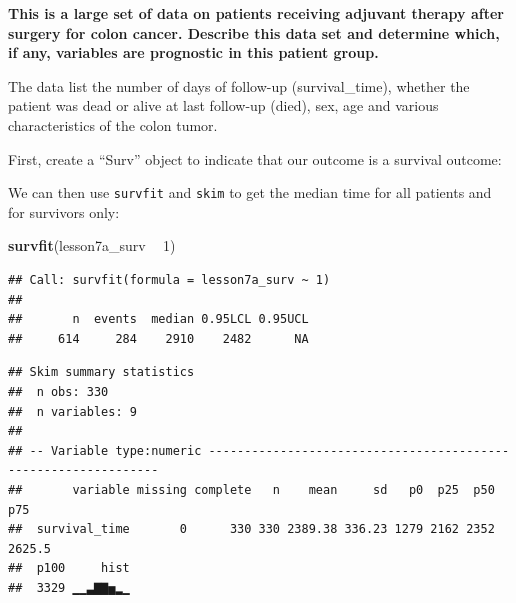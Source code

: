 \documentclass[]{book}
\newenvironment{Shaded}{\begin{snugshade}}{\end{snugshade}}
\newcommand{\DecValTok}[1]{\textcolor[rgb]{0.00,0.00,0.81}{#1}}
\newcommand{\KeywordTok}[1]{\textcolor[rgb]{0.13,0.29,0.53}{\textbf{#1}}}
\newcommand{\NormalTok}[1]{#1}
\newcommand{\OperatorTok}[1]{\textcolor[rgb]{0.81,0.36,0.00}{\textbf{#1}}}
\newcommand{\StringTok}[1]{\textcolor[rgb]{0.31,0.60,0.02}{#1}}
\begin{document}
\textbf{This is a large set of data on patients receiving adjuvant
therapy after surgery for colon cancer. Describe this data set and
determine which, if any, variables are prognostic in this patient
group.}

The data list the number of days of follow-up (survival\_time), whether
the patient was dead or alive at last follow-up (died), sex, age and
various characteristics of the colon tumor.

First, create a ``Surv'' object to indicate that our outcome is a
survival outcome:

\begin{Shaded}
\end{Shaded}

We can then use \texttt{survfit} and \texttt{skim} to get the median
time for all patients and for survivors only:

\begin{Shaded}
\begin{Highlighting}[]
\KeywordTok{survfit}\NormalTok{(lesson7a_surv }\OperatorTok{~}\StringTok{ }\DecValTok{1}\NormalTok{)}
\end{Highlighting}
\end{Shaded}

\begin{verbatim}
## Call: survfit(formula = lesson7a_surv ~ 1)
## 
##       n  events  median 0.95LCL 0.95UCL 
##     614     284    2910    2482      NA
\end{verbatim}

\begin{Shaded}
\end{Shaded}

\begin{verbatim}
## Skim summary statistics
##  n obs: 330 
##  n variables: 9 
## 
## -- Variable type:numeric ---------------------------------------------------------------
##       variable missing complete   n    mean     sd   p0  p25  p50    p75
##  survival_time       0      330 330 2389.38 336.23 1279 2162 2352 2625.5
##  p100     hist
##  3329 ▁▁▃▇▇▅▂▁
\end{verbatim}
\end{document}

